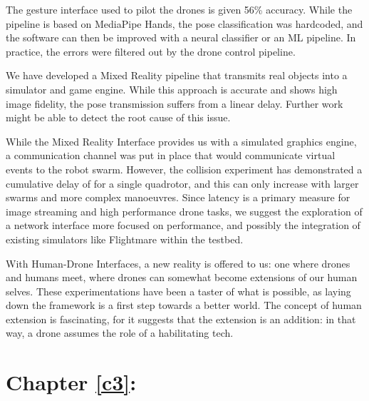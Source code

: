 The gesture interface used to pilot the drones is given 56\% accuracy. While the pipeline is based on MediaPipe Hands, the pose classification was hardcoded, and the software can then be improved with a neural classifier or an ML pipeline. In practice, the errors were filtered out by the drone control pipeline. 

We have developed a Mixed Reality pipeline that transmits real objects into a simulator and game engine. While this approach is accurate and shows high image fidelity, the pose transmission suffers from a linear  delay. Further work might be able to detect the root cause of this issue.

While the Mixed Reality Interface provides us with a simulated graphics engine, a communication channel was put in place that would communicate virtual events to the robot swarm. However, the collision experiment has demonstrated a cumulative delay of   for a single quadrotor, and this can only increase with larger swarms and more complex manoeuvres. Since latency is a primary measure for image streaming and high performance drone tasks, we suggest the exploration of a network interface more focused on performance, and possibly the integration of existing simulators like Flightmare within the testbed.

With Human-Drone Interfaces, a new reality is offered to us: one where drones and humans meet, where drones can somewhat become extensions of our human selves. These experimentations have been a taster of what is possible, as laying down the framework is a first step towards a better world. The concept of human extension is fascinating, for it suggests that the extension is an addition: in that way, a drone assumes the role of a habilitating tech.

\section*{Chapter \ref{c3}: }

